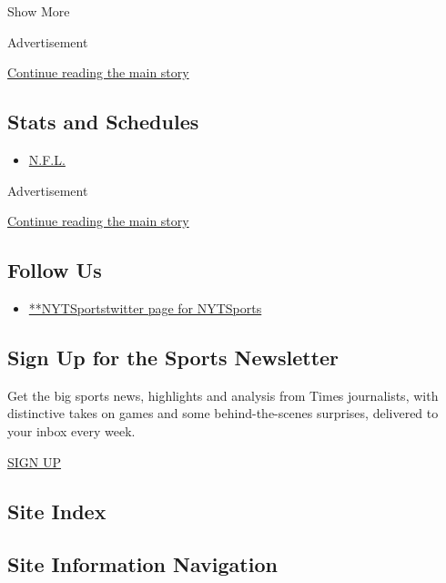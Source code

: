 Show More

Advertisement

\protect\hyperlink{after-mid1}{Continue reading the main story}

\hypertarget{stats-and-schedules}{%
\subsection{Stats and Schedules}\label{stats-and-schedules}}

\begin{itemize}
\tightlist
\item
  \protect\hyperlink{}{N.F.L.}
\end{itemize}

Advertisement

\protect\hyperlink{after-mktg}{Continue reading the main story}

\hypertarget{follow-us}{%
\subsection{Follow Us}\label{follow-us}}

\begin{itemize}
\tightlist
\item
  \href{https://twitter.com/NYTSports}{**NYTSportstwitter page for
  NYTSports}
\end{itemize}

\hypertarget{sign-up-for-the-sports-newsletter}{%
\subsection{Sign Up for the Sports
Newsletter}\label{sign-up-for-the-sports-newsletter}}

Get the big sports news, highlights and analysis from Times journalists,
with distinctive takes on games and some behind-the-scenes surprises,
delivered to your inbox every week.

\href{/newsletters/signup/SP}{SIGN UP}

\hypertarget{site-index}{%
\subsection{Site Index}\label{site-index}}

\hypertarget{site-information-navigation}{%
\subsection{Site Information
Navigation}\label{site-information-navigation}}

